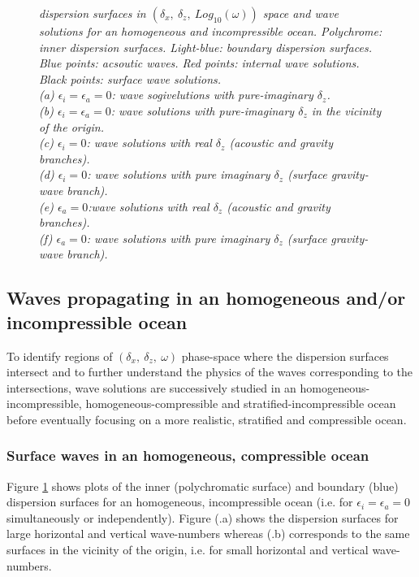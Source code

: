 \documentclass[a4paper,11pt]{article}
\begin{document}
\begin{figure}[!h]
\begin{subfigure}{0.36\linewidth}
		\caption{}
	\end{subfigure}
	\caption{\textit{dispersion surfaces in $(\delta_x,\ \delta_z,\ Log_{10}(\omega))$ space and wave solutions for an homogeneous and incompressible ocean. Polychrome: inner dispersion surfaces. Light-blue: boundary dispersion surfaces. Blue points: acsoutic waves. Red points: internal wave solutions. Black points: surface wave solutions.\\
	(a) $\epsilon_i=\epsilon_a=0$: wave sogivelutions with pure-imaginary $\delta_z$.\\
	(b)  $\epsilon_i=\epsilon_a=0$: wave solutions with pure-imaginary $\delta_z$ in the vicinity of the origin.\\
	(c) $\epsilon_i=0$: wave solutions with real $\delta_z$ (acoustic and gravity branches).\\ 
	(d) $\epsilon_i=0$: wave solutions with pure imaginary $\delta_z$ (surface gravity-wave branch).\\ 
	(e) $\epsilon_a=0$:wave solutions with real $\delta_z$ (acoustic and gravity branches).\\ 
	(f) $\epsilon_a=0$: wave solutions with pure imaginary $\delta_z$ (surface gravity-wave branch).\\
	}}
	\label{FigFullHomogeneous}
\end{figure}

\subsection{Waves propagating in an homogeneous and/or incompressible ocean}
\label{SubSectionHomogeneousIncomp}
To identify regions of $(\delta_x,\ \delta_z,\ \omega)$ phase-space where the dispersion surfaces intersect and to further understand the physics of the waves corresponding to the intersections, wave solutions are successively studied in an homogeneous-incompressible, homogeneous-compressible and stratified-incompressible ocean before eventually focusing on a more realistic, stratified and compressible ocean.\\

\subsubsection{Surface waves in an homogeneous, compressible ocean}
Figure \ref{FigFullHomogeneous} shows plots of the inner (polychromatic surface) and boundary (blue) dispersion surfaces for an homogeneous, incompressible ocean (i.e. for $\epsilon_i=\epsilon_a= 0$ simultaneously or independently). Figure (.a) shows the dispersion surfaces for large horizontal and vertical wave-numbers whereas (.b) corresponds to the same surfaces in the vicinity of the origin, i.e. for small horizontal and vertical wave-numbers.
\end{document}
